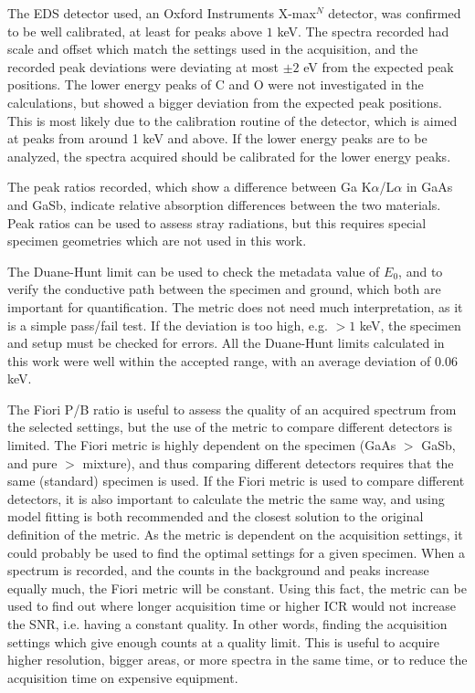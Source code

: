 The EDS detector used, an Oxford Instruments X-max$^N$ detector, was confirmed to be well calibrated, at least for peaks above $1$ keV.
The spectra recorded had scale and offset which match the settings used in the acquisition, and the recorded peak deviations were deviating at most $\pm 2$ eV from the expected peak positions.
The lower energy peaks of C and O were not investigated in the calculations, but showed a bigger deviation from the expected peak positions.
This is most likely due to the calibration routine of the detector, which is aimed at peaks from around 1 keV and above.
If the lower energy peaks are to be analyzed, the spectra acquired should be calibrated for the lower energy peaks.


The peak ratios recorded, which show a difference between Ga K$\alpha$/L$\alpha$ in GaAs and GaSb, indicate relative absorption differences between the two materials.
Peak ratios can be used to assess stray radiations, but this requires special specimen geometries which are not used in this work.

The Duane-Hunt limit can be used to check the metadata value of $E_0$, and to verify the conductive path between the specimen and ground, which both are important for quantification.
The metric does not need much interpretation, as it is a simple pass/fail test.
If the deviation is too high, e.g. $>1$ keV, the specimen and setup must be checked for errors.
All the Duane-Hunt limits calculated in this work were well within the accepted range, with an average deviation of $0.06$ keV.

The Fiori P/B ratio is useful to assess the quality of an acquired spectrum from the selected settings, but the use of the metric to compare different detectors is limited.
The Fiori metric is highly dependent on the specimen (GaAs $>$ GaSb, and pure $>$ mixture), and thus comparing different detectors requires that the same (standard) specimen is used.
If the Fiori metric is used to compare different detectors, it is also important to calculate the metric the same way, and using model fitting is both recommended and the closest solution to the original definition of the metric.
As the metric is dependent on the acquisition settings, it could probably be used to find the optimal settings for a given specimen.
When a spectrum is recorded, and the counts in the background and peaks increase equally much, the Fiori metric will be constant.
Using this fact, the metric can be used to find out where longer acquisition time or higher ICR would not increase the SNR, i.e. having a constant quality.
In other words, finding the acquisition settings which give enough counts at a quality limit.
This is useful to acquire higher resolution, bigger areas, or more spectra in the same time, or to reduce the acquisition time on expensive equipment.


